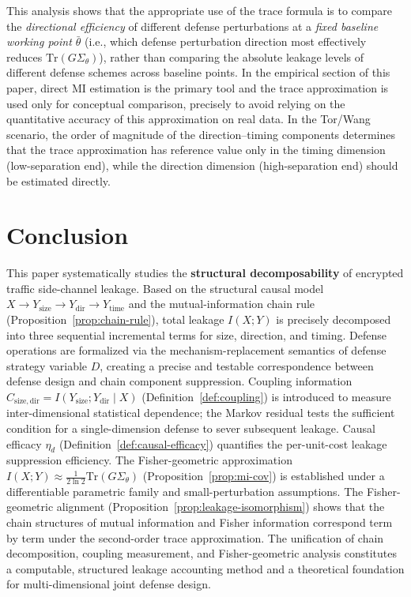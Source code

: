 \documentclass[lettersize,journal]{IEEEtran}
\begin{document}
This analysis shows that the appropriate use of the trace formula is to
compare the \emph{directional efficiency} of different defense perturbations
at a \emph{fixed baseline working point $\bar\theta$} (i.e., which defense
perturbation direction most effectively reduces $\mathrm{Tr}(G\Sigma_\theta)$),
rather than comparing the absolute leakage levels of different defense
schemes across baseline points.
In the empirical section of this paper, direct MI estimation is the primary
tool and the trace approximation is used only for conceptual comparison,
precisely to avoid relying on the quantitative accuracy of this approximation
on real data.
In the Tor/Wang scenario, the order of magnitude of the direction--timing
components determines that the trace approximation has reference value only
in the timing dimension (low-separation end), while the direction dimension
(high-separation end) should be estimated directly.

\section{Conclusion}\label{sec:conclusion}

This paper systematically studies the \textbf{structural decomposability}
of encrypted traffic side-channel leakage.
Based on the structural causal model
$X\to Y_{\mathrm{size}}\to Y_{\mathrm{dir}}\to Y_{\mathrm{time}}$
and the mutual-information chain rule
(Proposition~\ref{prop:chain-rule}), total leakage $I(X;Y)$ is precisely
decomposed into three sequential incremental terms for size, direction, and
timing.
Defense operations are formalized via the mechanism-replacement semantics of
defense strategy variable $D$, creating a precise and testable correspondence
between defense design and chain component suppression.
Coupling information $C_{\mathrm{size,dir}}=I(Y_{\mathrm{size}};Y_{\mathrm{dir}}\mid X)$
(Definition~\ref{def:coupling}) is introduced to measure inter-dimensional
statistical dependence; the Markov residual tests the sufficient condition
for a single-dimension defense to sever subsequent leakage.
Causal efficacy $\eta_d$ (Definition~\ref{def:causal-efficacy}) quantifies
the per-unit-cost leakage suppression efficiency.
The Fisher-geometric approximation
$I(X;Y)\approx\frac{1}{2\ln 2}\mathrm{Tr}(G\Sigma_\theta)$
(Proposition~\ref{prop:mi-cov}) is established under a differentiable
parametric family and small-perturbation assumptions.
The Fisher-geometric alignment (Proposition~\ref{prop:leakage-isomorphism})
shows that the chain structures of mutual information and Fisher information
correspond term by term under the second-order trace approximation.
The unification of chain decomposition, coupling measurement, and
Fisher-geometric analysis constitutes a computable, structured leakage
accounting method and a theoretical foundation for multi-dimensional joint
defense design.
\end{document}
